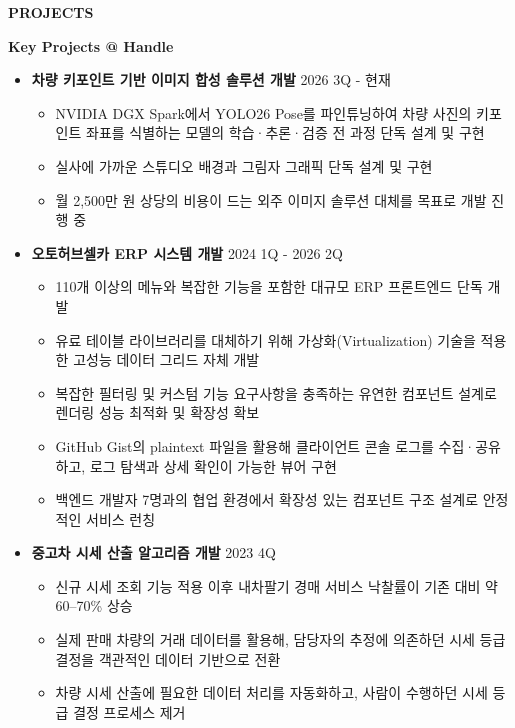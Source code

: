 \documentclass[a4paper, 11pt]{article}
\newcommand{\csection}[2]{
    \vspace{12pt}
    {\Large\textbf{#1}} \hrulefill \\ \vspace{3pt}
    #2
}
\newcommand{\csubsection}[1]{
    \vspace{5pt}
    {\large \textbf{#1}} \\ \vspace{2pt}
}
\begin{document}
\csection{PROJECTS}{
    
    \csubsection{Key Projects @ Handle}
    \begin{itemize}[leftmargin=*, itemsep=8pt]
    
        \item \textbf{차량 키포인트 기반 이미지 합성 솔루션 개발} \hfill 2026 3Q - 현재
        \begin{itemize}[label=$\cdot$, noitemsep]
            \item NVIDIA DGX Spark에서 YOLO26 Pose를 파인튜닝하여 차량 사진의 키포인트 좌표를 식별하는 모델의 학습·추론·검증 전 과정 단독 설계 및 구현
            \item 실사에 가까운 스튜디오 배경과 그림자 그래픽 단독 설계 및 구현
            \item 월 2,500만 원 상당의 비용이 드는 외주 이미지 솔루션 대체를 목표로 개발 진행 중
        \end{itemize}

        \item \textbf{오토허브셀카 ERP 시스템 개발} \hfill 2024 1Q - 2026 2Q
        \begin{itemize}[label=$\cdot$, noitemsep]
            \item 110개 이상의 메뉴와 복잡한 기능을 포함한 대규모 ERP 프론트엔드 단독 개발
            \item 유료 테이블 라이브러리를 대체하기 위해 가상화(Virtualization) 기술을 적용한 고성능 데이터 그리드 자체 개발
            \item 복잡한 필터링 및 커스텀 기능 요구사항을 충족하는 유연한 컴포넌트 설계로 렌더링 성능 최적화 및 확장성 확보
            \item GitHub Gist의 plaintext 파일을 활용해 클라이언트 콘솔 로그를 수집·공유하고, 로그 탐색과 상세 확인이 가능한 뷰어 구현
            \item 백엔드 개발자 7명과의 협업 환경에서 확장성 있는 컴포넌트 구조 설계로 안정적인 서비스 런칭
        \end{itemize}

        \item \textbf{중고차 시세 산출 알고리즘 개발} \hfill 2023 4Q
        \begin{itemize}[label=$\cdot$, noitemsep]
            \item 신규 시세 조회 기능 적용 이후 내차팔기 경매 서비스 낙찰률이 기존 대비 약 60--70\% 상승
            \item 실제 판매 차량의 거래 데이터를 활용해, 담당자의 추정에 의존하던 시세 등급 결정을 객관적인 데이터 기반으로 전환
            \item 차량 시세 산출에 필요한 데이터 처리를 자동화하고, 사람이 수행하던 시세 등급 결정 프로세스 제거
        \end{itemize}


\end{itemize}}
\end{document}
